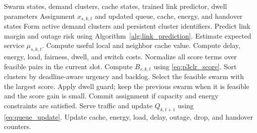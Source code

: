 \begin{algorithm}[!t]
\caption{\pclr\ Scheduling}
\label{alg:p3clr}
\begin{algorithmic}[1]
\REQUIRE Swarm states, demand clusters, cache states, trained link predictor, dwell parameters
\ENSURE Assignment $x_{s,k,t}$ and updated queue, cache, energy, and handover states
\STATE Form active demand clusters and persistent cluster identifiers.
    \STATE Predict link margin and outage risk using Algorithm~\ref{alg:link_prediction}.
    \STATE Estimate expected service $\mu_{s,k,t}$.
    \STATE Compute useful local and neighbor cache value.
    \STATE Compute delay, energy, load, fairness, dwell, and switch costs.
    \STATE Normalize all score terms over feasible pairs in the current slot.
    \STATE Compute $B_{s,k,t}$ using \eqref{eq:p3clr_score}.
\ENDFOR
\STATE Sort clusters by deadline-aware urgency and backlog.
    \STATE Select the feasible swarm with the largest score.
    \STATE Apply dwell guard; keep the previous swarm when it is feasible and the score gain is small.
    \STATE Commit assignment if capacity and energy constraints are satisfied.
\ENDFOR
\STATE Serve traffic and update $Q_{k,t+1}$ using \eqref{eq:queue_update}.
\STATE Update cache, energy, load, delay, outage, drop, and handover counters.
\end{algorithmic}
\end{algorithm}
